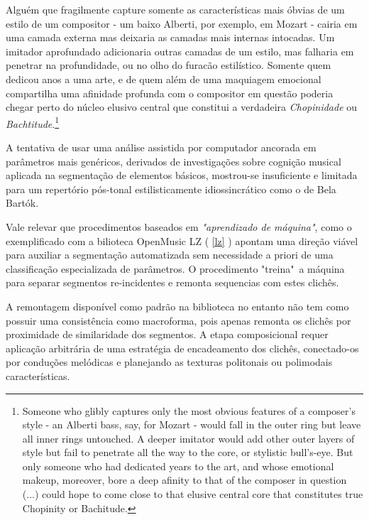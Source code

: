 \documentclass[
	12pt,				%
	openright,			%
	twoside,			%
	a4paper,			%
	english,			%
	french,				%
	spanish,			%
	brazil				%
	]{abntex2}
\begin{document}
\begin{citacao}
Alguém que fragilmente capture somente as características mais óbvias de um estilo de um compositor - um baixo Alberti, por exemplo, em Mozart - cairia em uma camada externa mas deixaria as camadas mais internas intocadas.
Um imitador aprofundado adicionaria outras camadas de um estilo, mas falharia em penetrar na profundidade, ou no olho do furacão estilístico. Somente quem dedicou anos a uma arte, e de quem além de uma maquiagem emocional compartilha uma afinidade profunda com o compositor em questão poderia chegar perto do núcleo elusivo central que constitui a verdadeira \textit{Chopinidade} ou \textit{Bachtitude}.\cite[ p.54]{cope2004virtual}\footnote{Someone who glibly captures only the most obvious features of a composer's style - an Alberti bass, say, for Mozart - would fall in the outer ring but leave all
inner rings untouched. A deeper imitator would add other outer layers of style but fail to penetrate all the way to the core, or stylistic bull's-eye. But only someone who had dedicated years to the art, and whose emotional makeup, moreover, bore a deep afinity to that of the composer in question (...) could hope to come close to that elusive central core that constitutes true Chopinity or Bachitude.\cite[ p.54]{cope2004virtual}}
\end{citacao}


A tentativa de usar uma análise assistida por computador ancorada em parâmetros mais genéricos, derivados de investigações sobre cognição musical aplicada na segmentação de elementos básicos, mostrou-se insuficiente e limitada para um repertório pós-tonal estilisticamente idiossincrático como o de Bela Bartók.

Vale relevar que procedimentos baseados em \textit{"aprendizado de máquina"}, como o exemplificado com a bilioteca OpenMusic LZ ( \autoref{lz} ) apontam uma direção viável para auxiliar a segmentação automatizada sem necessidade a priori de uma classificação especializada de parâmetros. O procedimento "treina"\ a máquina para separar segmentos re-incidentes e remonta sequencias com estes clichês. 

A remontagem disponível como padrão na biblioteca no entanto não tem como possuir uma consistência como macroforma, pois apenas remonta os clichês por proximidade de similaridade dos segmentos.
A etapa composicional requer aplicação arbitrária de uma estratégia de encadeamento dos clichês, conectado-os por conduções melódicas e planejando as texturas politonais ou polimodais características.
\end{document}
